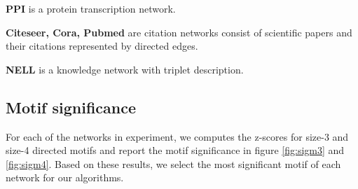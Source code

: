 \documentclass{article}
\theoremstyle{definition}
\begin{document}
\textbf{PPI} \cite{PPI} is a protein transcription network.

\textbf{Citeseer, Cora, Pubmed} \cite{citeseer,cora,pubmed} are citation networks 
consist of scientific papers and their citations represented by directed edges.

\textbf{NELL} \cite{NELL} is a knowledge network with triplet description.

\begin{table}[H]
\centering
{}
\caption{Datasets for unsupervised embeddings}
\label{t:ungraph}
\end{table}

\begin{table}
\centering
{}
\caption{Datasets for semi-supervised embeddings}
\label{t:ungraph}
\end{table}


\subsection{Motif significance}

For each of the networks in experiment, we computes the z-scores for
size-3 and size-4 directed motifs and report the motif significance
in figure \ref{fig:sigm3} and \ref{fig:sigm4}. Based on these results, 
we select the most significant motif of each network for our algorithms. 
\end{document}
